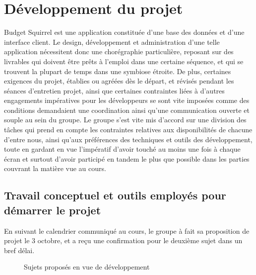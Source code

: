\documentclass[a4paper,12pt]{article}
\begin{document}
\newpage

\section{Développement du projet}

Budget Squirrel est une application constituée d'une base des données et d'une interface client. Le design, développement et administration d'une telle application nécessitent donc une chorégraphie particulière, reposant sur des livrables qui doivent être prêts à l'emploi dans une certaine séquence, et qui se trouvent la plupart de temps dans une symbiose étroite. De plus, certaines exigences du projet, établies ou agréées dès le départ, et révisés pendant les séances d'entretien projet, ainsi que certaines contraintes liées à d'autres engagements impératives pour les développeurs se sont vite imposées comme des conditions demandaient une coordination ainsi qu'une communication ouverte et souple au sein du groupe. Le groupe s'est vite mis d'accord sur une division des tâches qui prend en compte les contraintes relatives aux disponibilités de chacune d'entre nous, ainsi qu'aux préférences des techniques et outils des développement, toute en gardant en vue l'impératif d'avoir touché au moins une fois à chaque écran et surtout d'avoir participé en tandem le plus que possible dans les parties couvrant la matière vue au cours.

\subsection{Travail conceptuel et outils employés pour démarrer le projet}

En suivant le calendrier communiqué au cours, le groupe à fait sa proposition de projet le 3 octobre, et a reçu une confirmation pour le deuxième sujet dans un bref délai.

\begin{figure}[!ht]
\noindent
{}
\caption{\footnotesize{Sujets proposés en vue de développement}}
\end{figure}
\end{document}
